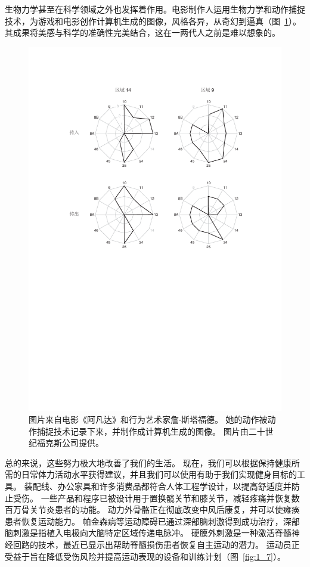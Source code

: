 生物力学甚至在科学领域之外也发挥着作用。电影制作人运用生物力学和动作捕捉技术，为游戏和电影创作计算机生成的图像，风格各异，从奇幻到逼真（图~\ref{fig:1_6}）。
其成果将美感与科学的准确性完美结合，这在一两代人之前是难以想象的。


\begin{figure}[!htb]
	\centering
	\includegraphics[width=1.0\linewidth]{chap1/1_6}
	\caption{图片来自电影《阿凡达》和行为艺术家詹$\cdot$斯塔福德。
		她的动作被动作捕捉技术记录下来，并制作成计算机生成的图像。
		图片由二十世纪福克斯公司提供。 \label{fig:1_6}}
\end{figure}


总的来说，这些努力极大地改善了我们的生活。
现在，我们可以根据保持健康所需的日常体力活动水平获得建议，并且我们可以使用有助于我们实现健身目标的工具。
装配线、办公家具和许多消费品都符合人体工程学设计，以提高舒适度并防止受伤。
一些产品和程序已被设计用于置换髋关节和膝关节，减轻疼痛并恢复数百万骨关节炎患者的功能。
动力外骨骼正在彻底改变中风后康复，并可以使瘫痪患者恢复运动能力。
帕金森病等运动障碍已通过深部脑刺激得到成功治疗，深部脑刺激是指植入电极向大脑特定区域传递电脉冲。
硬膜外刺激是一种激活脊髓神经回路的技术，最近已显示出帮助脊髓损伤患者恢复自主运动的潜力。
运动员正受益于旨在降低受伤风险并提高运动表现的设备和训练计划（图~\ref{fig:1_7}）。


